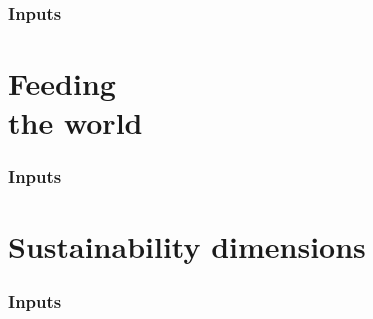 \documentclass[print,Draft]{faosyb}
\begin{document}



\begin{tablepages}
\section{Inputs}
\small
  
\clearpage

\end{tablepages}


\part[Feeding the world]{Feeding\\ the world}
\lipsum
\EndPartIntro




\begin{tablepages}
\section{Inputs}
\small
  
\clearpage

\end{tablepages}


\part[Sustainability dimensions]{Sustain\-ability dimensions}
\lipsum
\EndPartIntro




\begin{tablepages}
\section{Inputs}
\small
  
\clearpage

\end{tablepages}


\end{document}
